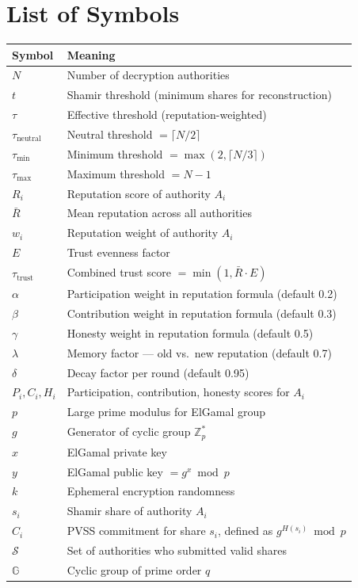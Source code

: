 \documentclass[12pt,a4paper]{article}
\theoremstyle{definition}
\theoremstyle{remark}
\begin{document}
\section*{List of Symbols}
\begin{center}
\begin{tabular}{p{2.2cm}p{11cm}}
\toprule
\textbf{Symbol} & \textbf{Meaning} \\
\midrule
$N$               & Number of decryption authorities \\
$t$               & Shamir threshold (minimum shares for reconstruction) \\
$\tau$            & Effective threshold (reputation-weighted) \\
$\tau_{\text{neutral}}$ & Neutral threshold $= \lceil N/2 \rceil$ \\
$\tau_{\text{min}}$     & Minimum threshold $= \max(2, \lceil N/3 \rceil)$ \\
$\tau_{\text{max}}$     & Maximum threshold $= N - 1$ \\
$R_i$             & Reputation score of authority $A_i$ \\
$\bar{R}$         & Mean reputation across all authorities \\
$w_i$             & Reputation weight of authority $A_i$ \\
$E$               & Trust evenness factor \\
$\tau_{\text{trust}}$ & Combined trust score $= \min(1, \bar{R} \cdot E)$ \\
$\alpha$          & Participation weight in reputation formula (default 0.2) \\
$\beta$           & Contribution weight in reputation formula (default 0.3) \\
$\gamma$          & Honesty weight in reputation formula (default 0.5) \\
$\lambda$         & Memory factor — old vs.\ new reputation (default 0.7) \\
$\delta$          & Decay factor per round (default 0.95) \\
$P_i, C_i, H_i$  & Participation, contribution, honesty scores for $A_i$ \\
$p$               & Large prime modulus for ElGamal group \\
$g$               & Generator of cyclic group $\mathbb{Z}_p^*$ \\
$x$               & ElGamal private key \\
$y$               & ElGamal public key $= g^x \bmod p$ \\
$k$               & Ephemeral encryption randomness \\
$s_i$             & Shamir share of authority $A_i$ \\
$C_i$             & PVSS commitment for share $s_i$, defined as $g^{H(s_i)} \bmod p$ \\
$\mathcal{S}$     & Set of authorities who submitted valid shares \\
$\mathbb{G}$      & Cyclic group of prime order $q$ \\
\bottomrule
\end{tabular}
\end{center}
\end{document}
